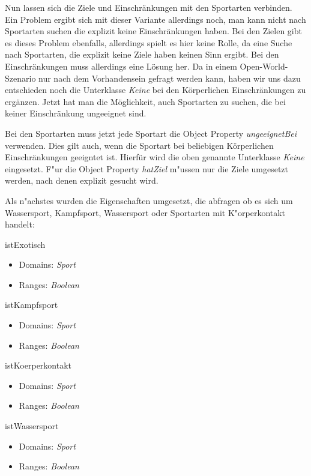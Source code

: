 Nun lassen sich die Ziele und Einschr\"ankungen mit den Sportarten verbinden. Ein Problem ergibt sich mit dieser Variante allerdings noch, man kann nicht nach Sportarten suchen die explizit keine Einschr\"ankungen haben. Bei den Zielen gibt es dieses Problem ebenfalls, allerdings spielt es hier keine Rolle, da eine Suche nach Sportarten, die explizit keine Ziele haben keinen Sinn ergibt. Bei den Einschr\"ankungen muss allerdings eine L\"osung her. Da in einem Open-World-Szenario nur nach dem Vorhandensein gefragt werden kann, haben wir uns dazu entschieden noch die Unterklasse \textit{Keine} bei den K\"orperlichen Einschr\"ankungen zu erg\"anzen. Jetzt hat man die M\"oglichkeit, auch Sportarten zu suchen, die bei keiner Einschr\"ankung ungeeignet sind.

Bei den Sportarten muss jetzt jede Sportart die Object Property \textit{ungeeignetBei} verwenden. Dies gilt auch, wenn die Sportart bei beliebigen K\"orperlichen Einschr\"ankungen geeigntet ist. Hierfür wird die oben genannte Unterklasse \textit{Keine} eingesetzt. F"ur die Object Property \textit{hatZiel} m"ussen nur die Ziele umgesetzt werden, nach denen explizit gesucht wird.


Als n"achstes wurden die Eigenschaften umgesetzt, die abfragen ob es sich um Wassersport, Kampfsport, Wassersport oder Sportarten mit K"orperkontakt handelt:

\begin{capitemize}
	\item istExotisch
		\begin{itemize}
			\item Domains: \textit{Sport}
			\item Ranges: \textit{Boolean}
		\end{itemize}
	\item istKampfsport
		\begin{itemize}
			\item Domains: \textit{Sport}
			\item Ranges: \textit{Boolean}
		\end{itemize}
	\item istKoerperkontakt
		\begin{itemize}
			\item Domains: \textit{Sport}
			\item Ranges: \textit{Boolean}
		\end{itemize}
	\item istWassersport
		\begin{itemize}
			\item Domains: \textit{Sport}
			\item Ranges: \textit{Boolean}
		\end{itemize}
\end{capitemize}

